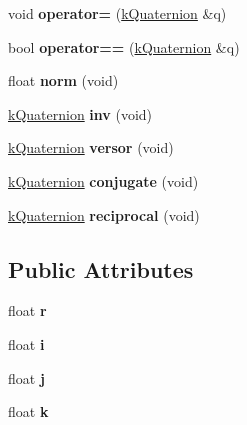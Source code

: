 \begin{DoxyCompactItemize}
\item 
void {\bfseries operator=} (\hyperlink{classkQuaternion}{k\+Quaternion} \&q)\hypertarget{classkQuaternion_a02340df8aec8392a17fa6644be34a360}{}\label{classkQuaternion_a02340df8aec8392a17fa6644be34a360}

\item 
bool {\bfseries operator==} (\hyperlink{classkQuaternion}{k\+Quaternion} \&q)\hypertarget{classkQuaternion_a0d2571c18862c02bd36cbdabc3d15af7}{}\label{classkQuaternion_a0d2571c18862c02bd36cbdabc3d15af7}

\item 
float {\bfseries norm} (void)\hypertarget{classkQuaternion_ab82936e9305a3f4ccc4b2c595881c5da}{}\label{classkQuaternion_ab82936e9305a3f4ccc4b2c595881c5da}

\item 
\hyperlink{classkQuaternion}{k\+Quaternion} {\bfseries inv} (void)\hypertarget{classkQuaternion_aa1fda1494a4c8a0321c072c1510eb0c5}{}\label{classkQuaternion_aa1fda1494a4c8a0321c072c1510eb0c5}

\item 
\hyperlink{classkQuaternion}{k\+Quaternion} {\bfseries versor} (void)\hypertarget{classkQuaternion_a4a04dbc061679cc2cf4241de361cfd6f}{}\label{classkQuaternion_a4a04dbc061679cc2cf4241de361cfd6f}

\item 
\hyperlink{classkQuaternion}{k\+Quaternion} {\bfseries conjugate} (void)\hypertarget{classkQuaternion_ac6499af96761a4fc5afac3cf62a387fb}{}\label{classkQuaternion_ac6499af96761a4fc5afac3cf62a387fb}

\item 
\hyperlink{classkQuaternion}{k\+Quaternion} {\bfseries reciprocal} (void)\hypertarget{classkQuaternion_a2d17d3d7eee3809f3aec59bd6e3fefc4}{}\label{classkQuaternion_a2d17d3d7eee3809f3aec59bd6e3fefc4}

\end{DoxyCompactItemize}
\subsection*{Public Attributes}
\begin{DoxyCompactItemize}
\item 
float {\bfseries r}\hypertarget{classkQuaternion_a856e152179f6116a478b2650064fa0de}{}\label{classkQuaternion_a856e152179f6116a478b2650064fa0de}

\item 
float {\bfseries i}\hypertarget{classkQuaternion_a26ff17e9921a568a83658bedf62d0d40}{}\label{classkQuaternion_a26ff17e9921a568a83658bedf62d0d40}

\item 
float {\bfseries j}\hypertarget{classkQuaternion_a7a9a190b543fc248017d43c50f3cff6e}{}\label{classkQuaternion_a7a9a190b543fc248017d43c50f3cff6e}

\item 
float {\bfseries k}\hypertarget{classkQuaternion_a42ca54ef4737cae765625a68e5ee0983}{}\label{classkQuaternion_a42ca54ef4737cae765625a68e5ee0983}

\end{DoxyCompactItemize}


